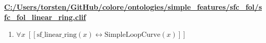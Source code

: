 \documentclass{article}
\begin{document}
\textbf{\url{C:/Users/torsten/GitHub/colore/ontologies/simple\_features/sfc\_fol/sfc\_fol\_linear\_ring.clif}}

\begin{enumerate}
\item $\forall x\;  \left[ \left[ \textrm{sf\_linear\_ring}(x) \leftrightarrow \textrm{SimpleLoopCurve}(x) \right] \right]$
\end{enumerate}
\end{document}
